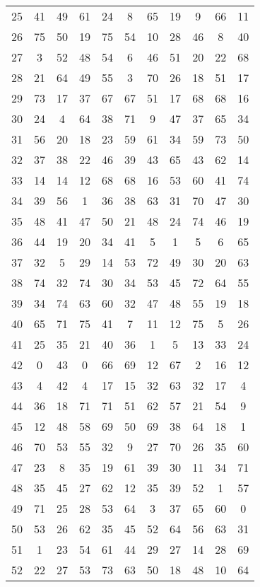 \begin{table}
\begin{tabular}{c c c c c c c c c c c }
25 & 41 & 49 & 61 & 24 & 8 & 65 & 19 & 9 & 66 & 11 \\
26 & 75 & 50 & 19 & 75 & 54 & 10 & 28 & 46 & 8 & 40 \\
27 & 3 & 52 & 48 & 54 & 6 & 46 & 51 & 20 & 22 & 68 \\
28 & 21 & 64 & 49 & 55 & 3 & 70 & 26 & 18 & 51 & 17 \\
29 & 73 & 17 & 37 & 67 & 67 & 51 & 17 & 68 & 68 & 16 \\
30 & 24 & 4 & 64 & 38 & 71 & 9 & 47 & 37 & 65 & 34 \\
31 & 56 & 20 & 18 & 23 & 59 & 61 & 34 & 59 & 73 & 50 \\
32 & 37 & 38 & 22 & 46 & 39 & 43 & 65 & 43 & 62 & 14 \\
33 & 14 & 14 & 12 & 68 & 68 & 16 & 53 & 60 & 41 & 74 \\
34 & 39 & 56 & 1 & 36 & 38 & 63 & 31 & 70 & 47 & 30 \\
35 & 48 & 41 & 47 & 50 & 21 & 48 & 24 & 74 & 46 & 19 \\
36 & 44 & 19 & 20 & 34 & 41 & 5 & 1 & 5 & 6 & 65 \\
37 & 32 & 5 & 29 & 14 & 53 & 72 & 49 & 30 & 20 & 63 \\
38 & 74 & 32 & 74 & 30 & 34 & 53 & 45 & 72 & 64 & 55 \\
39 & 34 & 74 & 63 & 60 & 32 & 47 & 48 & 55 & 19 & 18 \\
40 & 65 & 71 & 75 & 41 & 7 & 11 & 12 & 75 & 5 & 26 \\
41 & 25 & 35 & 21 & 40 & 36 & 1 & 5 & 13 & 33 & 24 \\
42 & 0 & 43 & 0 & 66 & 69 & 12 & 67 & 2 & 16 & 12 \\
43 & 4 & 42 & 4 & 17 & 15 & 32 & 63 & 32 & 17 & 4 \\
44 & 36 & 18 & 71 & 71 & 51 & 62 & 57 & 21 & 54 & 9 \\
45 & 12 & 48 & 58 & 69 & 50 & 69 & 38 & 64 & 18 & 1 \\
46 & 70 & 53 & 55 & 32 & 9 & 27 & 70 & 26 & 35 & 60 \\
47 & 23 & 8 & 35 & 19 & 61 & 39 & 30 & 11 & 34 & 71 \\
48 & 35 & 45 & 27 & 62 & 12 & 35 & 39 & 52 & 1 & 57 \\
49 & 71 & 25 & 28 & 53 & 64 & 3 & 37 & 65 & 60 & 0 \\
50 & 53 & 26 & 62 & 35 & 45 & 52 & 64 & 56 & 63 & 31 \\
51 & 1 & 23 & 54 & 61 & 44 & 29 & 27 & 14 & 28 & 69 \\
52 & 22 & 27 & 53 & 73 & 63 & 50 & 18 & 48 & 10 & 64 \\

\end{tabular}
\end{table}
